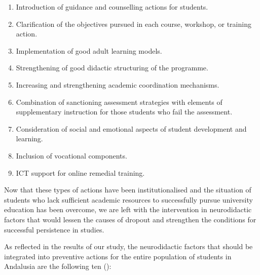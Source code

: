 \documentclass[english]{textolivre}
\begin{document}
\begin{enumerate}[label=\alph*.]
    \item Introduction of guidance and counselling actions for students.
    \item Clarification of the objectives pursued in each course, workshop, or training action.
    \item Implementation of good adult learning models.
    \item Strengthening of good didactic structuring of the programme.
    \item Increasing and strengthening academic coordination mechanisms.
    \item Combination of sanctioning assessment strategies with elements of supplementary instruction for those students who fail the assessment.
    \item Consideration of social and emotional aspects of student development and learning.
    \item Inclusion of vocational components.
    \item ICT support for online remedial training.
\end{enumerate}

Now that these types of actions have been institutionalised and the situation of students who lack sufficient academic resources to successfully pursue university education has been overcome, we are left with the intervention in neurodidactic factors that would lessen the causes of dropout and strengthen the conditions for successful persistence in studies.

As reflected in the results of our study, the neurodidactic factors that should be integrated into preventive actions for the entire population of students in Andalusia are the following ten ():
\end{document}
